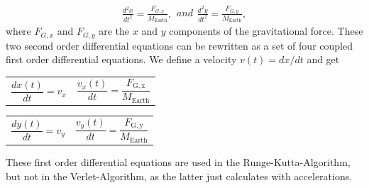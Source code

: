 \documentclass[a4paper]{article}
\begin{document}
\begin{subequations}
\begin{align}
\frac{d^2x}{dt^2}=\frac{F_{G,x}}{M_{\mathrm{Earth}}},
\end{align}
and 
\begin{align}
\frac{d^2y}{dt^2}=\frac{F_{G,y}}{M_{\mathrm{Earth}}},
\end{align}
\end{subequations}
 where $F_{G,x}$ and $F_{G,y}$ are the $x$ and $y$ components of the gravitational force.
\newline
These two second order differential equations can be rewritten as a set of four coupled first order differential equations. We define a velocity $v(t) = dx/dt$ and get 









\noindent\begin{tabularx}{\textwidth}{@{}XX@{}}
  \begin{equation}
  \frac{dx(t)}{dt} = v_x 
  \end{equation} &
  \begin{equation}
  \frac{v_x(t)}{dt} = \frac{F_{\mathrm{G,x}}}{M_\mathrm{Earth}}
  \end{equation}
\end{tabularx}

\noindent\begin{tabularx}{\textwidth}{@{}XX@{}}
  \begin{equation}
  \frac{dy(t)}{dt} = v_y
  \end{equation} &
  \begin{equation}
  \frac{v_y(t)}{dt} = \frac{F_{\mathrm{G,y}}}{M_\mathrm{Earth}}
  \end{equation}
\end{tabularx}

These first order differential equations are used in the Runge-Kutta-Algorithm, but not in the Verlet-Algorithm, as the latter just calculates with accelerations. 
\end{document}
